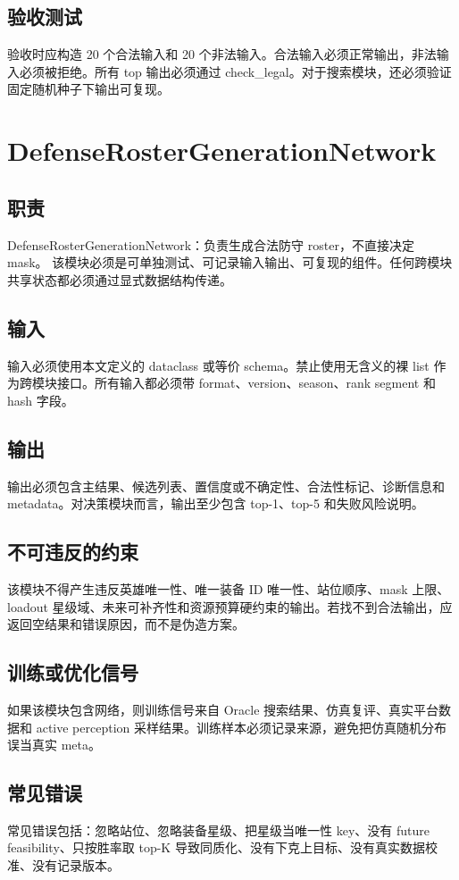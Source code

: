 \documentclass[UTF8,12pt,openany]{ctexbook}
\begin{document}
\subsection{验收测试}
验收时应构造 20 个合法输入和 20 个非法输入。合法输入必须正常输出，非法输入必须被拒绝。所有 top 输出必须通过 check\_legal。对于搜索模块，还必须验证固定随机种子下输出可复现。

\section{DefenseRosterGenerationNetwork}
\subsection{职责}
DefenseRosterGenerationNetwork：负责生成合法防守 roster，不直接决定 mask。 该模块必须是可单独测试、可记录输入输出、可复现的组件。任何跨模块共享状态都必须通过显式数据结构传递。

\subsection{输入}
输入必须使用本文定义的 dataclass 或等价 schema。禁止使用无含义的裸 list 作为跨模块接口。所有输入都必须带 format、version、season、rank segment 和 hash 字段。

\subsection{输出}
输出必须包含主结果、候选列表、置信度或不确定性、合法性标记、诊断信息和 metadata。对决策模块而言，输出至少包含 top-1、top-5 和失败风险说明。

\subsection{不可违反的约束}
该模块不得产生违反英雄唯一性、唯一装备 ID 唯一性、站位顺序、mask 上限、loadout 星级域、未来可补齐性和资源预算硬约束的输出。若找不到合法输出，应返回空结果和错误原因，而不是伪造方案。

\subsection{训练或优化信号}
如果该模块包含网络，则训练信号来自 Oracle 搜索结果、仿真复评、真实平台数据和 active perception 采样结果。训练样本必须记录来源，避免把仿真随机分布误当真实 meta。

\subsection{常见错误}
常见错误包括：忽略站位、忽略装备星级、把星级当唯一性 key、没有 future feasibility、只按胜率取 top-K 导致同质化、没有下克上目标、没有真实数据校准、没有记录版本。
\end{document}
